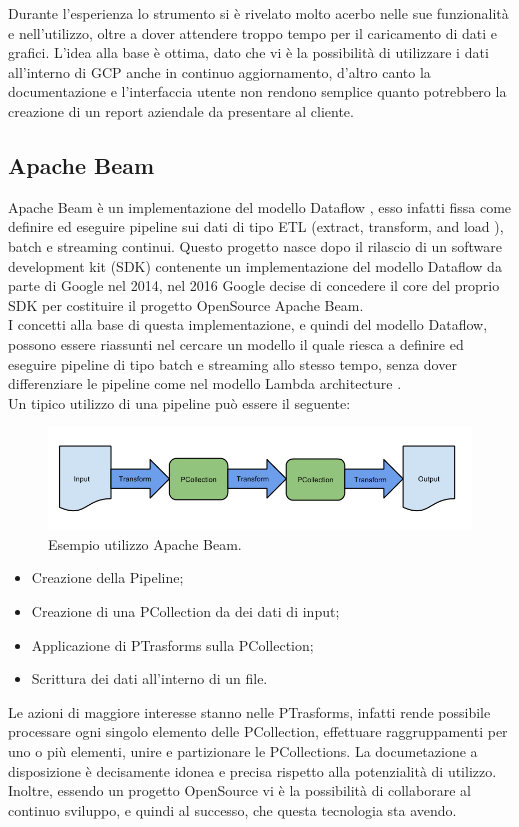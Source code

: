 Durante l'esperienza lo strumento si è rivelato molto acerbo nelle sue funzionalità e nell'utilizzo, oltre a dover attendere troppo tempo per il caricamento di dati e grafici. L'idea alla base è ottima, dato che vi è la possibilità di utilizzare i dati all'interno di GCP anche in continuo aggiornamento, d'altro canto la documentazione e l'interfaccia utente non rendono semplice quanto potrebbero la creazione di un report aziendale da presentare al cliente.	
\subsection{Apache Beam}
Apache Beam è un implementazione del modello Dataflow \cite{modelloDataflow}, esso infatti fissa come definire ed eseguire pipeline sui dati di tipo \gls{ETL} (extract, transform, and load ), batch e streaming continui. Questo progetto nasce dopo il rilascio di un software development kit  (\gls{SDK}) contenente un implementazione del modello Dataflow da parte di Google nel 2014, nel 2016 Google decise di concedere il core del proprio SDK per costituire il progetto \gls{OpenSource} Apache Beam.
\\ I concetti alla base di questa implementazione, e quindi del modello Dataflow, possono essere riassunti nel cercare un modello il quale riesca a definire ed eseguire pipeline di tipo batch e streaming allo stesso tempo, senza dover differenziare le pipeline come nel modello Lambda architecture \cite{Lambdaarchitecture}.
\\ Un tipico utilizzo di una pipeline può essere il seguente:
\begin{figure}[h!]
	\centering
	\includegraphics[scale=0.5]{figures/design-your-pipeline-linear}
	\caption[Esempio utilizzo Apache Beam. ]{Esempio utilizzo Apache Beam.
		\label{fig:logoGCP}}
\end{figure}	
\begin{itemize}
	\item Creazione della Pipeline;
	\item Creazione di una PCollection da dei dati di input;
	\item Applicazione di PTrasforms sulla PCollection;
	\item Scrittura dei dati all'interno di un file.
\end{itemize}
Le azioni di maggiore interesse stanno nelle PTrasforms, infatti rende possibile processare ogni singolo elemento delle PCollection, effettuare raggruppamenti per uno o più elementi, unire  e partizionare le PCollections.
La documetazione a disposizione è decisamente idonea e precisa rispetto alla potenzialità di utilizzo. Inoltre, essendo un progetto OpenSource vi è la possibilità di collaborare al continuo sviluppo, e quindi al successo, che questa tecnologia sta avendo.
